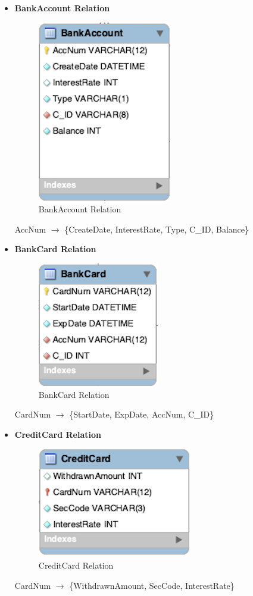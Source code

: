 \documentclass[12pt,a4paper]{article}
\begin{document}
\begin{itemize}
      \item \textbf{BankAccount Relation}
        \begin{figure}[H]
            \centering
            \includegraphics[]{Picture/BankAccountRelation.png}
            \caption{BankAccount Relation}
        \end{figure}
     AccNum $\longrightarrow$ \{CreateDate, InterestRate, Type, C\_ID, Balance\}\\
     
     \item \textbf{BankCard Relation}
        \begin{figure}[H]
            \centering
            \includegraphics[]{Picture/BankCardRelation.png}
            \caption{BankCard Relation}
        \end{figure}
     CardNum $\longrightarrow$ \{StartDate, ExpDate, AccNum, C\_ID\}\\
     
     \item \textbf{CreditCard Relation}
        \begin{figure}[H]
            \centering
            \includegraphics[]{Picture/CreditCardRelation.png}
            \caption{CreditCard Relation}
        \end{figure}
     CardNum $\longrightarrow$ \{WithdrawnAmount, SecCode, InterestRate\}\\
     

\end{itemize}
\end{document}
